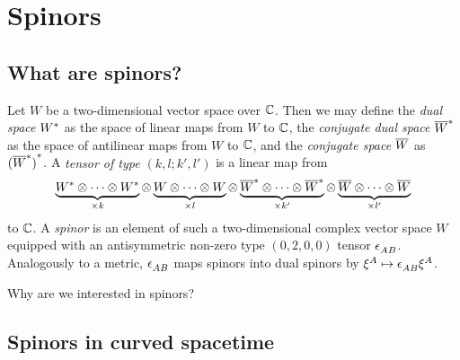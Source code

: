\section{Spinors}%
\label{sec:spinors}

\subsection{What are spinors?}%
\label{sub:what_are_spinors_}

Let $W$ be a two-dimensional vector space over $\mathbb{C}$. Then we may define the \emph{dual space} ${W}^{*}$ as the space of linear maps from $W$ to $\mathbb{C}$, the \emph{conjugate dual space} ${\overline{W}}^{*}$ as the space of antilinear maps from $W$ to $\mathbb{C}$, and the \emph{conjugate space} $\overline{W}$ as ${({\overline{W}}^{*})}^{*}$. A \emph{tensor of type $(k, l; k', l')$} is a linear map from
\begin{align}
	\underbrace{{W}^{*} \otimes \dots \otimes {W}^{*}}_{\times k}
	\otimes \underbrace{W \otimes \dots \otimes W}_{\times l}
	\otimes \underbrace{{\overline{W}}^{*} \otimes \dots \otimes {\overline{W}}^{*}}_{\times k'}
	\otimes \underbrace{\overline{W} \otimes \dots \otimes \overline{W}}_{\times l'}
\end{align}
to $\mathbb{C}$. A \emph{spinor} is an element of such a two-dimensional complex vector space $W$ equipped with an antisymmetric non-zero type $(0, 2, 0, 0)$ tensor $\tensor{\epsilon}{_A_B}$. Analogously to a metric, $\tensor{\epsilon}{_A_B}$ maps spinors into dual spinors by $\tensor{\xi}{^A} \mapsto \tensor{\epsilon}{_A_B} \tensor{\xi}{^A}$.


Why are we interested in spinors?


\subsection{Spinors in curved spacetime}%
\label{sub:spinors_in_curved_spacetime}


